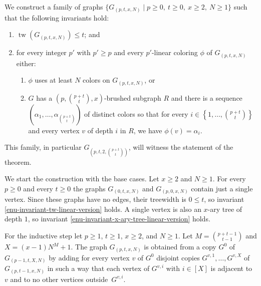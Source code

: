 \documentclass[11pt]{article}
\begin{document}
We construct a family of graphs $\{G_{(p,t,x,N)}\mid p\geq0,\ t\geq0,\ x\geq2,\ N\geq1\}$ such that the following invariants hold:
\begin{enumerate}
\item $\operatorname{tw}(G_{(p,t,x,N)}) \leq t$; and
\label{enu-invariant-tw-linear-version}
\item for every integer $p'$ with $p'\geq p$ and every $p'$-linear coloring $\phi$ of $G_{(p,t,x,N)}$ either:
\label{enu-invariant-general-for-colorings}
\begin{enumerate}
\item $\phi$ uses at least $N$ colors on $G_{(p,t,x,N)}$, or 
\label{enu-invariant-N-colors}
\item 
$G$ has a $\left(p,\binom{p+t}{t},x\right)$-brushed subgraph $R$ and
there is a sequence $\left(\alpha_1,\ldots,\alpha_{\binom{p+t}{t}}\right)$ of distinct colors so that 
for every $i\in\left\{1,\ldots,\binom{p+t}{t}\right\}$ and every vertex $v$ of depth $i$ in $R$, we have $\phi(v)=\alpha_i$.
\label{enu-invariant-x-ary-tree-linear-version}
\end{enumerate}
\end{enumerate}
This family, in particular $G_{\left(p,t,2,\binom{p+t}{t}\right)}$, will witness the statement of the theorem. 


We start the construction with the base cases. 
Let $x\geq2$ and $N\geq1$.
For every $p\geq0$ and every $t\geq0$ the graphs $G_{(0,t,x,N)}$ and $G_{(p,0,x,N)}$ contain just a single vertex.
Since these graphs have no edges, their treewidth is $0\leq t$, so invariant \eqref{enu-invariant-tw-linear-version} holds.
A single vertex is also an $x$-ary tree of depth $1$, so invariant \eqref{enu-invariant-x-ary-tree-linear-version} holds.

For the inductive step let $p\geq1$, $t\geq1$, $x\geq2$, and $N\geq1$. 
Let $M = \binom{p+t-1}{t-1}$ and $X = (x-1)N^M +1$.
The graph $G_{(p,t,x,N)}$ is obtained from a copy $G^0$ of $G_{(p-1,t,X,N)}$
by adding for every vertex $v$ of $G^0$ disjoint copies $G^{v,1},\ldots,G^{v,X}$ of
$G_{(p,t-1,x,N)}$ in such a way that each vertex of $G^{v,i}$ with $i\in[X]$ is adjacent to
$v$ and to no other vertices outside~$G^{v,i}$.
\end{document}
